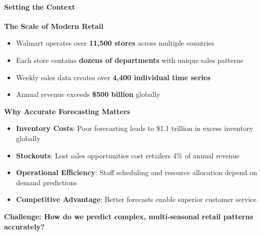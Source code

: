 %
%
%



{
	\framesubtitle{Setting the Context}
	
	\textbf{The Scale of Modern Retail}
	\begin{itemize}
		\item Walmart operates over \textbf{11,500 stores} across multiple countries
		\item Each store contains \textbf{dozens of departments} with unique sales patterns
		\item Weekly sales data creates over \textbf{4,400 individual time series}
		\item Annual revenue exceeds \textbf{\$500 billion} globally
	\end{itemize}
	
	\vspace{0.5cm}
	
	\textbf{Why Accurate Forecasting Matters}
	\begin{itemize}
		\item \textbf{Inventory Costs}: Poor forecasting leads to \$1.1 trillion in excess inventory globally
		\item \textbf{Stockouts}: Lost sales opportunities cost retailers 4\% of annual revenue
		\item \textbf{Operational Efficiency}: Staff scheduling and resource allocation depend on demand predictions
		\item \textbf{Competitive Advantage}: Better forecasts enable superior customer service
	\end{itemize}
	
	\vspace{0.5cm}
	
	\begin{center}
		\textbf{\textcolor{HSELblau}{Challenge: How do we predict complex, multi-seasonal retail patterns accurately?}}
	\end{center}
}
